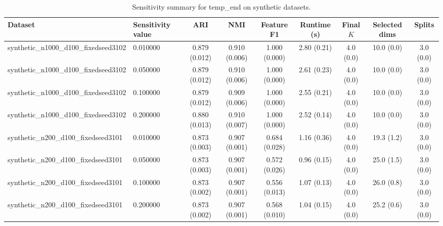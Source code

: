 \begin{table}[t]
\centering
\caption{Sensitivity summary for temp_end on synthetic datasets.}
\label{tab:sens-temp_end-synthetic}
\begin{tabular}{llccccccc}
\toprule
Dataset & Sensitivity value & ARI & NMI & Feature F1 & Runtime (s) & Final $K$ & Selected dims & Splits \\
\midrule
synthetic_n1000_d100_fixedseed3102 & 0.010000 & 0.879 (0.012) & 0.910 (0.006) & 1.000 (0.000) & 2.80 (0.21) & 4.0 (0.0) & 10.0 (0.0) & 3.0 (0.0) \\
synthetic_n1000_d100_fixedseed3102 & 0.050000 & 0.879 (0.012) & 0.910 (0.006) & 1.000 (0.000) & 2.61 (0.23) & 4.0 (0.0) & 10.0 (0.0) & 3.0 (0.0) \\
synthetic_n1000_d100_fixedseed3102 & 0.100000 & 0.879 (0.012) & 0.909 (0.006) & 1.000 (0.000) & 2.55 (0.21) & 4.0 (0.0) & 10.0 (0.0) & 3.0 (0.0) \\
synthetic_n1000_d100_fixedseed3102 & 0.200000 & 0.880 (0.013) & 0.910 (0.007) & 1.000 (0.000) & 2.52 (0.14) & 4.0 (0.0) & 10.0 (0.0) & 3.0 (0.0) \\
synthetic_n200_d100_fixedseed3101 & 0.010000 & 0.873 (0.003) & 0.907 (0.001) & 0.684 (0.028) & 1.16 (0.36) & 4.0 (0.0) & 19.3 (1.2) & 3.0 (0.0) \\
synthetic_n200_d100_fixedseed3101 & 0.050000 & 0.873 (0.003) & 0.907 (0.001) & 0.572 (0.026) & 0.96 (0.15) & 4.0 (0.0) & 25.0 (1.5) & 3.0 (0.0) \\
synthetic_n200_d100_fixedseed3101 & 0.100000 & 0.873 (0.002) & 0.907 (0.001) & 0.556 (0.013) & 1.07 (0.13) & 4.0 (0.0) & 26.0 (0.8) & 3.0 (0.0) \\
synthetic_n200_d100_fixedseed3101 & 0.200000 & 0.873 (0.002) & 0.907 (0.001) & 0.568 (0.010) & 1.04 (0.15) & 4.0 (0.0) & 25.2 (0.6) & 3.0 (0.0) \\
\bottomrule
\end{tabular}
\end{table}
